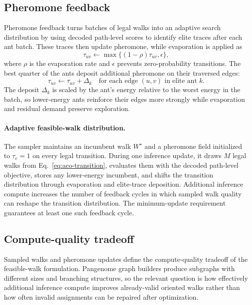 \documentclass[11pt]{article}
\begin{document}
\subsection{Pheromone feedback}

Pheromone feedback turns batches of legal walks into an adaptive search distribution by using decoded path-level scores to identify elite traces after each ant batch. These traces then update pheromone, while evaporation is applied as
\begin{equation}
\tau_{uv}\leftarrow \max\{(1-\rho)\tau_{uv},\epsilon\},
\label{eq:evaporation}
\end{equation}
where $\rho$ is the evaporation rate and $\epsilon$ prevents zero-probability transitions. The best quarter of the ants deposit additional pheromone on their traversed edges:
\begin{equation}
\tau_{uv}\leftarrow \tau_{uv}+\Delta_k
\quad\text{for each edge }(u,v)\text{ in elite ant }k.
\end{equation}
The deposit $\Delta_k$ is scaled by the ant's energy relative to the worst energy in the batch, so lower-energy ants reinforce their edges more strongly while evaporation and residual demand preserve exploration.

\paragraph{Adaptive feasible-walk distribution.}
The sampler maintains an incumbent walk $W^\star$ and a pheromone field initialized to $\tau_e=1$ on every legal transition. During one inference update, it draws $M$ legal walks from Eq.~\eqref{eq:aco-transition}, evaluates them with the decoded path-level objective, stores any lower-energy incumbent, and shifts the transition distribution through evaporation and elite-trace deposition. Additional inference compute increases the number of feedback cycles in which sampled walk quality can reshape the transition distribution. The minimum-update requirement guarantees at least one such feedback cycle.

\subsection{Compute-quality tradeoff}

Sampled walks and pheromone updates define the compute-quality tradeoff of the feasible-walk formulation. Pangenome graph builders produce subgraphs with different sizes and branching structures, so the relevant question is how effectively additional inference compute improves already-valid oriented walks rather than how often invalid assignments can be repaired after optimization.
\end{document}
